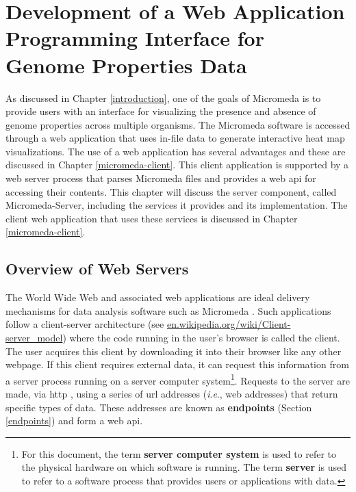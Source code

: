 \chapter{Development of a Web Application Programming Interface for Genome 
Properties Data} \label{micromeda-server}

As discussed in Chapter \ref{introduction}, one of the goals of Micromeda is to 
provide users with an interface for visualizing the presence and absence of 
genome properties across multiple organisms. The Micromeda software is accessed 
through a web application that uses in-file data to generate interactive heat 
map visualizations. The use of a web application has several advantages and 
these are discussed in Chapter \ref{micromeda-client}. This client application 
is supported by a web server process that parses Micromeda files and provides a 
web \gls{api} for accessing their contents. This chapter will discuss the server 
component, called Micromeda-Server, including the services it provides and its 
implementation. The client web application that uses these services is discussed 
in Chapter \ref{micromeda-client}.

\section{Overview of Web Servers} \label{web-servers}

The World Wide Web and associated web applications are ideal delivery mechanisms 
for data analysis software such as Micromeda \cite{berners1994world}. Such 
applications follow a client-server architecture \cite{svobodova1985client} (see 
\href{http://en.wikipedia.org/wiki/Client-server_model}{en.wikipedia.org/wiki/Client-server\_model}) 
where the code running in the user's browser is called the client. The user 
acquires this client by downloading it into their browser like any other 
webpage. If this client requires external data, it can request this information 
from a server process running on a server computer system\footnote{For this 
document, the term \textbf{server computer system} is used to refer to the 
physical hardware on which software is running. The term \textbf{server} is used 
to refer to a software process that provides users or applications with data.}. 
Requests to the server are made, via \gls{http} \cite{fielding1999hypertext}, 
using a series of \gls{url} addresses \cite{berners1994rfc} (\textit{i}.\textit{e}., web 
addresses) that return specific types of data. These addresses are known as 
\textbf{endpoints} (Section \ref{endpoints}) and form a web \gls{api}.

